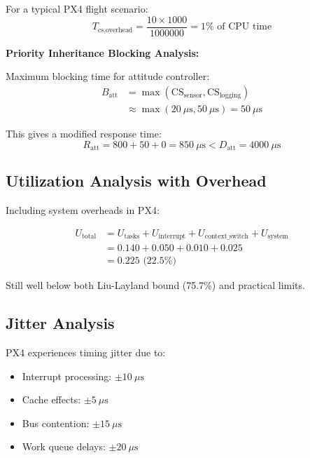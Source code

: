 \documentclass[12pt,a4paper]{article}
\begin{document}
For a typical PX4 flight scenario:
\begin{equation}
T_{\text{cs,overhead}} = \frac{10 \times 1000}{1000000} = 1\% \text{ of CPU time}
\end{equation}

\textbf{Priority Inheritance Blocking Analysis:}

Maximum blocking time for attitude controller:
\begin{align}
B_{\text{att}} &= \max(\text{CS}_{\text{sensor}}, \text{CS}_{\text{logging}}) \\
&\approx \max(20\ \mu\text{s}, 50\ \mu\text{s}) = 50\ \mu\text{s}
\end{align}

This gives a modified response time:
\begin{equation}
R_{\text{att}} = 800 + 50 + 0 = 850\ \mu\text{s} < D_{\text{att}} = 4000\ \mu\text{s}
\end{equation}

\subsection{Utilization Analysis with Overhead}

Including system overheads in PX4:

\begin{align}
U_{\text{total}} &= U_{\text{tasks}} + U_{\text{interrupt}} + U_{\text{context\_switch}} + U_{\text{system}} \\
&= 0.140 + 0.050 + 0.010 + 0.025 \\
&= 0.225 \text{ (22.5\%)}
\end{align}

Still well below both Liu-Layland bound (75.7\%) and practical limits.

\subsection{Jitter Analysis}

PX4 experiences timing jitter due to:
\begin{itemize}
\item Interrupt processing: $\pm 10\ \mu\text{s}$
\item Cache effects: $\pm 5\ \mu\text{s}$
\item Bus contention: $\pm 15\ \mu\text{s}$
\item Work queue delays: $\pm 20\ \mu\text{s}$
\end{itemize}
\end{document}
